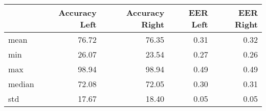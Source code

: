 \begin{tabular}{lrrrr}
\toprule
{} &  Accuracy Left &  Accuracy Right &  EER Left &  EER Right \\
\midrule
mean   &          76.72 &           76.35 &      0.31 &       0.32 \\
min    &          26.07 &           23.54 &      0.27 &       0.26 \\
max    &          98.94 &           98.94 &      0.49 &       0.49 \\
median &          72.08 &           72.05 &      0.30 &       0.31 \\
std    &          17.67 &           18.40 &      0.05 &       0.05 \\
\bottomrule
\end{tabular}
